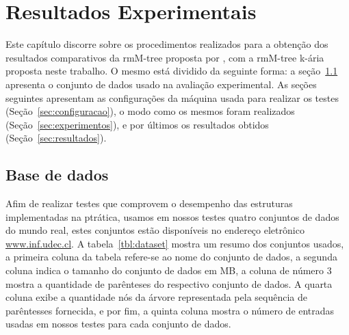 \chapter{Resultados Experimentais}\label{chp:resultados}

Este capítulo discorre sobre os procedimentos realizados para a obtenção dos resultados comparativos da rmM-tree proposta por \citet{paper-fully-functinal-succint-trees},
com a rmM-tree k-ária proposta neste trabalho. O mesmo está dividido da seguinte forma: a seção~\ref{sec:base-de-dados} apresenta o conjunto de dados usado na avaliação experimental.
As seções seguintes apresentam as configurações da máquina usada para realizar os testes (Seção~\ref{sec:configuracao}), o modo como os mesmos foram realizados (Seção~\ref{sec:experimentos}),
e por últimos os resultados obtidos (Seção~\ref{sec:resultados}).


\section{Base de dados}\label{sec:base-de-dados}
Afim de realizar testes que comprovem o desempenho das estruturas implementadas na ptrática, usamos em nossos testes quatro conjuntos de dados do mundo real,
estes conjuntos estão disponíveis no endereço eletrônico \href{http://www.inf.udec.cl/~jfuentess/datasets/sequences.php}{www.inf.udec.cl}.
A tabela~\ref{tbl:dataset} mostra um resumo dos conjuntos usados, a primeira coluna da tabela refere-se ao nome do conjunto de dados,
a segunda coluna indica o tamanho do conjunto de dados em MB, a coluna de número 3 mostra a quantidade de parênteses do respectivo conjunto de dados.
A quarta coluna exibe a quantidade nós da árvore representada pela sequência de parêntesses fornecida,
e  por fim, a quinta coluna mostra o número de entradas usadas em nossos testes para cada conjunto de dados.



